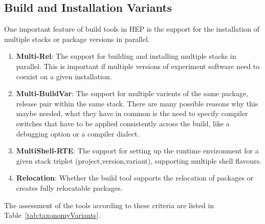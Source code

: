 \documentclass[12pt,a4paper]{article}
\begin{document}
\subsection{Build and Installation Variants}
One important feature of build tools in HEP is the support for the installation of multiple stacks or package versions in parallel. 
\begin{enumerate}
\item \textbf{Multi-Rel}: The support for building and installing multiple stacks in parallel. This is important if multiple versions of experiment software need to coexist on a given installation.
\item \textbf{Multi-BuildVar}: The support for multiple varients of the same package, release pair within the same stack. There are many possible reasons why this maybe needed, what they have in common is the need to specify compiler switches that have to be applied consistently across the build, like a debugging option or a compiler dialect.
\item \textbf{MultiShell-RTE}: The support for setting up the runtime environment for a given stack triplet (project,version,variant), supporting multiple shell flavours.
\item \textbf{Relocation}: Whether the build tool supports the relocation of packages or creates fully relocatable packages.
\end{enumerate}

The assessment of the tools according to these criteria are listed in Table~\ref{tab:taxonomyVariants}.
\end{document}
